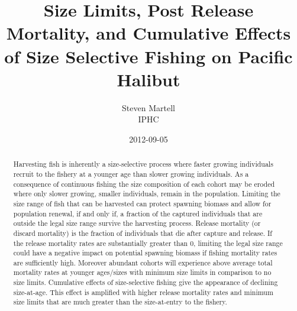 \documentclass[12pt]{article}
\title{Size Limits, Post Release Mortality, and Cumulative Effects of Size Selective Fishing on Pacific Halibut}
\author{ Steven Martell\\ IPHC }
\date{2012-09-05}
\begin{document}
\ifpdf
{}
\else
{}
\fi

\maketitle


\begin{abstract}
	Harvesting fish is inherently a size-selective process where faster growing individuals recruit to the fishery at a younger age than slower growing individuals.  As a consequence of continuous fishing the size composition of each cohort may be eroded where only slower growing, smaller individuals, remain in the population.  Limiting the size range of fish that can be harvested can protect spawning biomass and allow for population renewal, if and only if, a fraction of the captured individuals that are outside the legal size range survive the harvesting process.  Release mortality (or discard mortality) is the fraction of individuals that die after capture and release.  If the release mortality rates are substantially greater than 0, limiting the legal size range could have a negative impact on potential spawning biomass if fishing mortality rates are sufficiently high.  Moreover abundant cohorts will experience above average total mortality rates at younger ages/sizes with minimum size limits in comparison to no size limits.  Cumulative effects of size-selective fishing give the appearance of declining size-at-age.  This effect is amplified with higher release mortality rates and minimum size limits that are much greater than the size-at-entry to the fishery.
	
\end{abstract}






\end{document}
